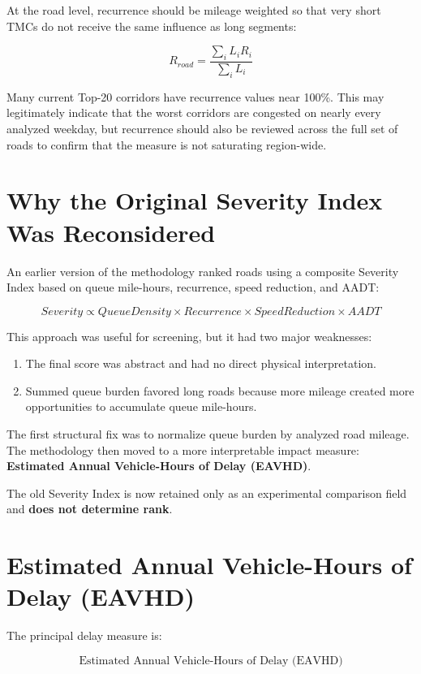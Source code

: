 \documentclass[11pt]{article}
\begin{document}
At the road level, recurrence should be mileage weighted so that very short TMCs do not receive the same influence as long segments:

\[
\boxed{
R_{road} = \frac{\sum_i L_i R_i}{\sum_i L_i}
}
\]

Many current Top-20 corridors have recurrence values near 100\%. This may legitimately indicate that the worst corridors are congested on nearly every analyzed weekday, but recurrence should also be reviewed across the full set of roads to confirm that the measure is not saturating region-wide.

\section{Why the Original Severity Index Was Reconsidered}

An earlier version of the methodology ranked roads using a composite Severity Index based on queue mile-hours, recurrence, speed reduction, and AADT:

\[
Severity \propto QueueDensity \times Recurrence \times SpeedReduction \times AADT
\]

This approach was useful for screening, but it had two major weaknesses:

\begin{enumerate}
    \item The final score was abstract and had no direct physical interpretation.
    \item Summed queue burden favored long roads because more mileage created more opportunities to accumulate queue mile-hours.
\end{enumerate}

The first structural fix was to normalize queue burden by analyzed road mileage. The methodology then moved to a more interpretable impact measure: \textbf{Estimated Annual Vehicle-Hours of Delay (EAVHD)}.

The old Severity Index is now retained only as an experimental comparison field and \textbf{does not determine rank}.

\section{Estimated Annual Vehicle-Hours of Delay (EAVHD)}

The principal delay measure is:

\[
\boxed{\text{Estimated Annual Vehicle-Hours of Delay (EAVHD)}}
\]
\end{document}
